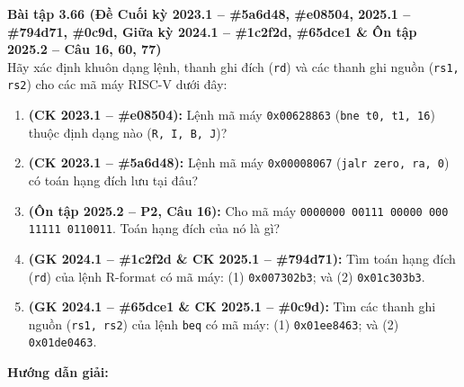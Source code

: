\textbf{Bài tập 3.66 (Đề Cuối kỳ 2023.1 -- \#5a6d48, \#e08504, 2025.1 -- \#794d71, \#0c9d, Giữa kỳ 2024.1 -- \#1c2f2d, \#65dce1 \& Ôn tập 2025.2 -- Câu 16, 60, 77)}\\
Hãy xác định khuôn dạng lệnh, thanh ghi đích (\texttt{rd}) và các thanh ghi nguồn (\texttt{rs1, rs2}) cho các mã máy RISC-V dưới đây:
\begin{enumerate}[label=\alph*)]
    \item \textbf{(CK 2023.1 -- \#e08504):} Lệnh mã máy \texttt{0x00628863} (\texttt{bne t0, t1, 16}) thuộc định dạng nào (\texttt{R, I, B, J})?
    \item \textbf{(CK 2023.1 -- \#5a6d48):} Lệnh mã máy \texttt{0x00008067} (\texttt{jalr zero, ra, 0}) có toán hạng đích lưu tại đâu?
    \item \textbf{(Ôn tập 2025.2 -- P2, Câu 16):} Cho mã máy \texttt{0000000 00111 00000 000 11111 0110011}. Toán hạng đích của nó là gì?
    \item \textbf{(GK 2024.1 -- \#1c2f2d \& CK 2025.1 -- \#794d71):} Tìm toán hạng đích (\texttt{rd}) của lệnh R-format có mã máy: (1) \texttt{0x007302b3}; và (2) \texttt{0x01c303b3}.
    \item \textbf{(GK 2024.1 -- \#65dce1 \& CK 2025.1 -- \#0c9d):} Tìm các thanh ghi nguồn (\texttt{rs1, rs2}) của lệnh \texttt{beq} có mã máy: (1) \texttt{0x01ee8463}; và (2) \texttt{0x01de0463}.
\end{enumerate}
\textbf{Hướng dẫn giải:}
